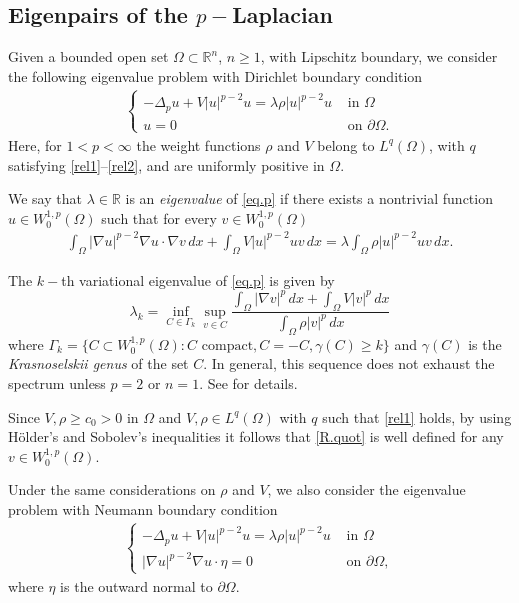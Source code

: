 \documentclass[12pt]{amsart}
\theoremstyle{definition}
\theoremstyle{remark}
\numberwithin{equation}{section}
\begin{document}
\subsection{Eigenpairs of the $p-$Laplacian}
Given a bounded open set $\Omega\subset \mathbb R^n$, $n\geq 1$, with Lipschitz boundary, we consider the following eigenvalue problem with Dirichlet boundary condition
\begin{align} \label{eq.p}
\begin{cases}
-\Delta_p u +V|u|^{p-2}u = \lambda \rho |u|^{p-2}u &\text{ in } \Omega\\
u=0 & \text{ on } \partial\Omega.
\end{cases}
\end{align}
Here, for $1<p<\infty$ the weight functions $\rho$ and $V$ belong to $L^q(\Omega)$, with $q$ satisfying \eqref{rel1}--\eqref{rel2}, and are uniformly positive  in $\Omega$.



We say that $\lambda\in \mathbb R$ is an \emph{eigenvalue} of \eqref{eq.p} if there exists a nontrivial function $u\in W^{1,p}_0(\Omega)$ such that for every $v\in W^{1,p}_0(\Omega)$
\begin{align} \label{debil}
\int_\Omega |\nabla u|^{p-2}\nabla u \cdot \nabla v\,dx +\int_\Omega V |u|^{p-2}uv\,dx = \lambda \int_\Omega \rho |u|^{p-2}uv\,dx.
\end{align}

The $k-$th variational eigenvalue of \eqref{eq.p} is given by
\begin{equation} \label{R.quot}
\lambda_k=\inf_{C\in \Gamma_k} \sup_{v\in C} \frac{\int_\Omega |\nabla v|^p\,dx + \int_\Omega V |v|^p\,dx}{\int_\Omega \rho|v|^p\,dx}
\end{equation}
where $\Gamma_k=\{C\subset W^{1,p}_0(\Omega)\colon C \text{ compact}, C=-C, \gamma(C)\geq k\}$ 
and $\gamma(C)$ is the \emph{Krasnoselskii genus} of the set $C$. In general, this sequence does not exhaust the spectrum unless $p=2$ or $n=1$. See \cite{L} for details.

Since $V,\rho\geq c_0>0$  in $\Omega$ and $V,\rho \in L^q(\Omega)$ with $q$ such that \eqref{rel1} holds,  by using H\"older's and Sobolev's inequalities it follows that \eqref{R.quot} is well defined  for any $v\in W^{1,p}_0(\Omega)$.
 
 

Under the same considerations on $\rho$ and $V$, we also consider the eigenvalue problem with Neumann boundary condition
\begin{align} \label{eq.n}
\begin{cases}
-\Delta_p u +V|u|^{p-2}u =\lambda  \rho |u|^{p-2}u &\text{ in } \Omega\\
|\nabla u|^{p-2}\nabla u\cdot \eta =0 & \text{ on } \partial\Omega,
\end{cases}
\end{align}
where $\eta$ is the outward normal to $\partial\Omega$.
\end{document}
